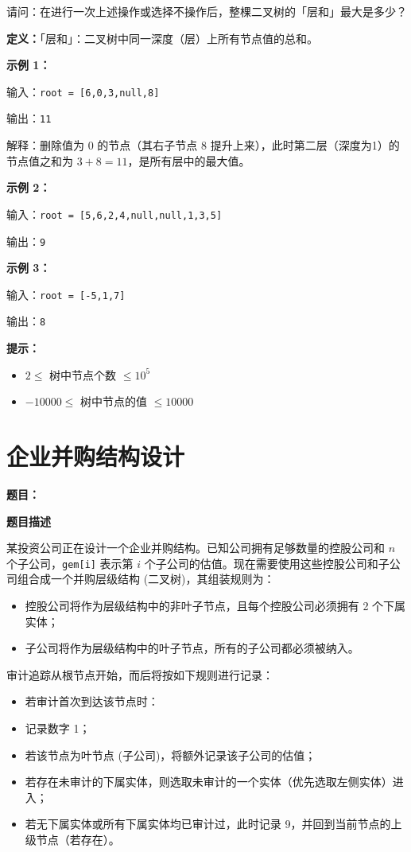 \documentclass[12pt, a4paper]{article}
\begin{document}
请问：在进行一次上述操作或选择不操作后，整棵二叉树的「层和」最大是多少？

\textbf{定义：}「层和」：二叉树中同一深度（层）上所有节点值的总和。

\textbf{示例 1：}

输入：\texttt{root = [6,0,3,null,8]}

输出：\texttt{11}

解释：删除值为 0 的节点（其右子节点 8 提升上来），此时第二层（深度为1）的节点值之和为 $3 + 8 = 11$，是所有层中的最大值。

\textbf{示例 2：}

输入：\texttt{root = [5,6,2,4,null,null,1,3,5]}

输出：\texttt{9}

\textbf{示例 3：}

输入：\texttt{root = [-5,1,7]}

输出：\texttt{8}

\textbf{提示：}
\begin{itemize}[leftmargin=2em]
  \item $2 \leq$ 树中节点个数 $\leq 10^5$
  \item $-10000 \leq$ 树中节点的值 $\leq 10000$
\end{itemize}



\section{企业并购结构设计}

\noindent\textbf{题目：}

\textbf{题目描述}

某投资公司正在设计一个企业并购结构。已知公司拥有足够数量的控股公司和 $n$ 个子公司，\texttt{gem[i]} 表示第 $i$ 个子公司的估值。现在需要使用这些控股公司和子公司组合成一个并购层级结构 (二叉树)，其组装规则为：
\begin{itemize}[leftmargin=2em]
  \item 控股公司将作为层级结构中的非叶子节点，且每个控股公司必须拥有 2 个下属实体；
  \item 子公司将作为层级结构中的叶子节点，所有的子公司都必须被纳入。
\end{itemize}

审计追踪从根节点开始，而后将按如下规则进行记录：
\begin{itemize}[leftmargin=2em]
  \item 若审计首次到达该节点时：
  \item 记录数字 1；
  \item 若该节点为叶节点 (子公司)，将额外记录该子公司的估值；
  \item 若存在未审计的下属实体，则选取未审计的一个实体（优先选取左侧实体）进入；
  \item 若无下属实体或所有下属实体均已审计过，此时记录 9，并回到当前节点的上级节点（若存在）。
\end{itemize}
\end{document}

